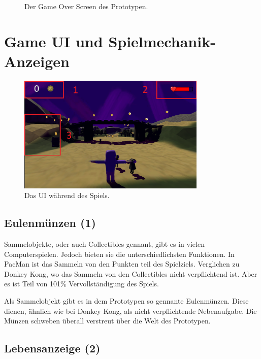 \begin{figure}[H]
\begin{minipage}{0.4\textwidth}
        \caption{Der Game Over Screen des Prototypen.}
        \label{UI02}
    \end{minipage}
\end{figure}



\section{Game UI und Spielmechanik-Anzeigen}

\begin{figure}[H]
    \centering
    \includegraphics[width=0.8\textwidth]{chapters/03/images/GameUI.png}
    \caption{Das UI während des Spiels.}
    \label{htl03}
\end{figure}

\subsection{Eulenmünzen (1)}
Sammelobjekte, oder auch Collectibles gennant, gibt es in vielen Computerspielen. Jedoch bieten sie die unterschiedlichsten Funktionen. In PacMan ist das Sammeln von den Punkten teil des Spielziels. Verglichen zu Donkey Kong, wo das Sammeln von den Collectibles nicht verpflichtend ist. Aber es ist Teil von 101\% Vervollständigung des Spiels.

Als Sammelobjekt gibt es in dem Prototypen so gennante \glqq Eulenmünzen\grqq. Diese dienen, ähnlich wie bei Donkey Kong, als nicht verpflichtende Nebenaufgabe. Die Münzen schweben überall verstreut über die Welt des Prototypen. 

\subsection{Lebensanzeige (2)}

